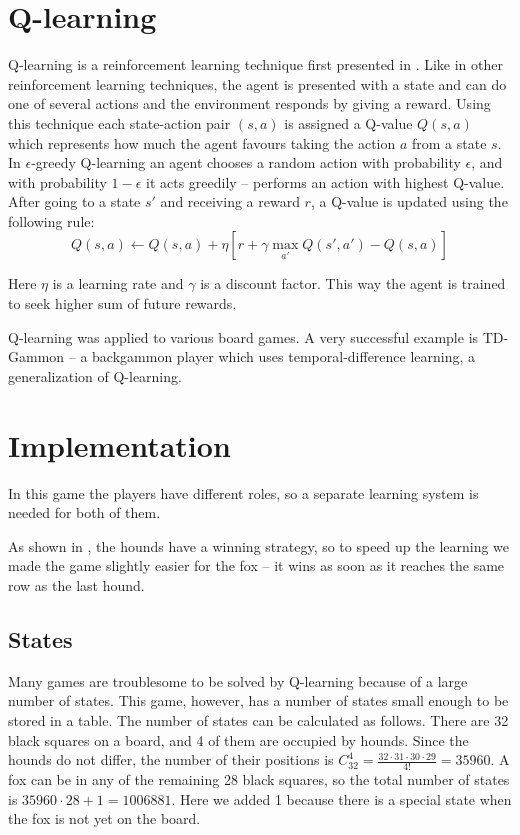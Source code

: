 \documentclass[a4paper]{article}
\begin{document}
\section{Q-learning}
Q-learning is a reinforcement learning technique first presented in
\cite{watkins89}. Like in other reinforcement learning techniques, the agent is
presented with a state and can do one of several actions and the environment
responds by giving a reward. Using this technique each state-action pair $(s,
a)$ is assigned a Q-value $Q(s, a)$ which represents how much the agent favours
taking the action $a$ from a state $s$. In $\epsilon$-greedy Q-learning an agent
chooses a random action with probability $\epsilon$, and with probability $1 -
\epsilon$ it acts greedily -- performs an action with highest Q-value. After
going to a state $s\prime$ and receiving a reward $r$, a Q-value is updated
using the following rule:
\[
    Q(s, a) \gets Q(s, a) + \eta [r + \gamma \max_{a\prime} Q(s\prime, a\prime)
    - Q(s, a)]
\]

Here $\eta$ is a learning rate and $\gamma$ is a discount factor. This way the
agent is trained to seek higher sum of future rewards.

Q-learning was applied to various board games. A very successful example is
TD\mbox{-}Gammon \cite{gerald95} -- a backgammon player which uses
temporal-difference learning, a generalization of Q-learning.

\section{Implementation}
In this game the players have different roles, so a separate learning system is
needed for both of them.

As shown in \cite{berlekamp82}, the hounds have a winning strategy, so to speed
up the learning we made the game slightly easier for the fox -- it wins as soon
as it reaches the same row as the last hound.

\subsection{States}
Many games are troublesome to be solved by Q-learning because of a large number
of states. This game, however, has a number of states small enough to be stored
in a table. The number of states can be calculated as follows. There are 32
black squares on a board, and 4 of them are occupied by hounds. Since the
hounds do not differ, the number of their positions is $C_{32}^4 = \frac{32
\cdot 31 \cdot 30 \cdot 29}{4!} = 35960$. A fox can be in any of the remaining
28 black squares, so the total number of states is $35960 \cdot 28 + 1 =
1006881$. Here we added 1 because there is a special state when the fox is not
yet on the board.
\end{document}
